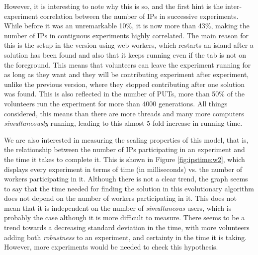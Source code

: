 \documentclass{sig-alternate}
\begin{document}
However, it is interesting to note why this is so, and the first hint
is the inter-experiment correlation between the number of IPs in
successive experiments. While before it was an unremarkable 10\%, it is
now more than 43\%, making the number of IPs in contiguous experiments
highly correlated. The main reason for this is the setup in the
version using web workers, which restarts an island after a solution has been
found and also that it keeps running even if the tab is not on the
foreground. This means that volunteers can leave the experiment
running for as long as they want and they will be contributing 
experiment after experiment, unlike the previous version, where they
stopped contributing after one solution was found. This is also
reflected in the number of PUTs, more than 50\% of the volunteers run the experiment for more than
4000 generations. All things considered, this means than there are
more threads and many more computers {\em simultaneously} running,
leading to this almost 5-fold increase in running time.


We are also interested in measuring the scaling properties of this
model, that is, the relationship between the number of IPs
participating in an experiment and the time it takes to complete
it. This is shown in Figure \ref{fig:ipstime:w2}, which displays every
experiment in terms of time (in milliseconds) vs. %
the number of workers participating
in it. Although there is not a clear trend, the graph seems to say
that the time needed for finding the solution in this evolutionary
algorithm does not depend on the number of workers participating in
it. This does not mean that it is independent on the number of {\em
  simultaneous} users, which is probably the case although it is more
difficult to measure. There seems to be a trend towards a decreasing
standard deviation in the time, with more volunteers adding both {\em
  robustness} to an experiment, and certainty in the time it is taking. %
 However, more experiments would be needed to check this hypothesis.
\end{document}
